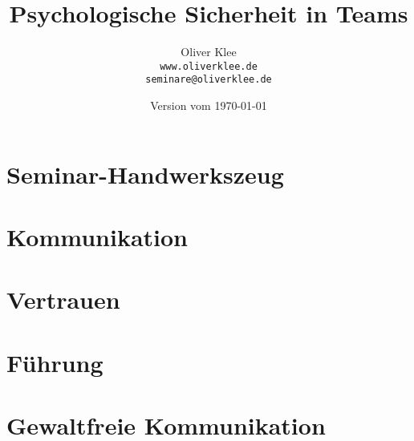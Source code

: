 \documentclass[a4paper,openany,twoside,titlepage,10pt,headsepline]{scrbook}
\title{ Psychologische Sicherheit in Teams }
\author{Oliver Klee\\\texttt{www.oliverklee.de}\\\texttt{seminare@oliverklee.de}}
\date{Version vom \today}
\begin{document}
\frontmatter

\maketitle

\tableofcontents


\mainmatter

\chapter{Seminar-Handwerkszeug}



\chapter{Kommunikation}




\chapter{Vertrauen}



\chapter{Führung}




\chapter{Gewaltfreie Kommunikation}


\backmatter





\printindex
\end{document}
